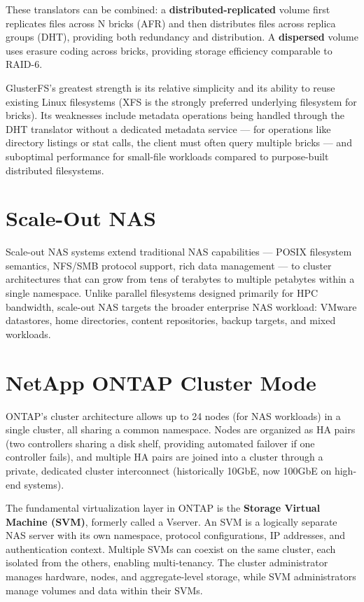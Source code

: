 These translators can be combined: a \textbf{distributed-replicated} volume first replicates files across N bricks (AFR) and then distributes files across replica groups (DHT), providing both redundancy and distribution. A \textbf{dispersed} volume uses erasure coding across bricks, providing storage efficiency comparable to RAID-6.

GlusterFS's greatest strength is its relative simplicity and its ability to reuse existing Linux filesystems (XFS is the strongly preferred underlying filesystem for bricks). Its weaknesses include metadata operations being handled through the DHT translator without a dedicated metadata service --- for operations like directory listings or stat calls, the client must often query multiple bricks --- and suboptimal performance for small-file workloads compared to purpose-built distributed filesystems.

\section{Scale-Out NAS}
Scale-out NAS systems extend traditional NAS capabilities --- POSIX filesystem semantics, NFS/SMB protocol support, rich data management --- to cluster architectures that can grow from tens of terabytes to multiple petabytes within a single namespace. Unlike parallel filesystems designed primarily for HPC bandwidth, scale-out NAS targets the broader enterprise NAS workload: VMware datastores, home directories, content repositories, backup targets, and mixed workloads.

\section{NetApp ONTAP Cluster Mode}
ONTAP's cluster architecture allows up to 24 nodes (for NAS workloads) in a single cluster, all sharing a common namespace. Nodes are organized as HA pairs (two controllers sharing a disk shelf, providing automated failover if one controller fails), and multiple HA pairs are joined into a cluster through a private, dedicated cluster interconnect (historically 10GbE, now 100GbE on high-end systems).

The fundamental virtualization layer in ONTAP is the \textbf{Storage Virtual Machine (SVM)}, formerly called a Vserver. An SVM is a logically separate NAS server with its own namespace, protocol configurations, IP addresses, and authentication context. Multiple SVMs can coexist on the same cluster, each isolated from the others, enabling multi-tenancy. The cluster administrator manages hardware, nodes, and aggregate-level storage, while SVM administrators manage volumes and data within their SVMs.

